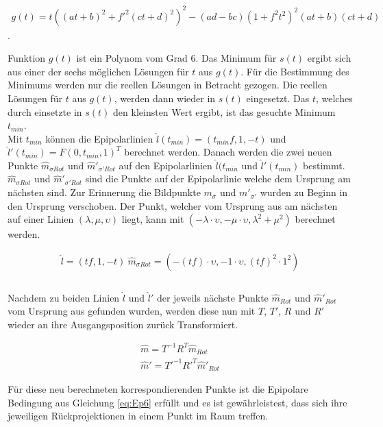 \begin{gather}
	g(t) = t((at+b)^2+f'^2(ct+d)^2)^2-(ad-bc)(1+f^2t^2)^2(at+b)(ct+d)
\end{gather}.

Funktion $g(t)$ ist ein Polynom vom Grad 6. Das Minimum für $s(t)$ ergibt sich aus einer der sechs möglichen Lösungen für $t$ aus $g(t)$. Für die Bestimmung des Minimums werden nur die reellen Lösungen in Betracht gezogen. Die reellen Lösungen für $t$ aus $g(t)$, werden dann wieder in $s(t)$ eingesetzt. Das $t$, welches durch einsetzte in $s(t)$ den kleinsten Wert ergibt, ist das gesuchte Minimum $t_{min}$. \\

Mit $t_{min}$ können die Epipolarlinien $\hat{l}(t_{min})=(t_{min}f,1,-t)$ und $\hat{l}'(t_{min}) = F(0,t_{min},1)^T$ berechnet werden. Danach werden die zwei neuen Punkte $\hat{m}_{\sigma Rot}$ und $\hat{m}'_{\sigma' Rot}$ auf den Epipolarlinien $\hat{l}(t_{min}$ und $\hat{l}'(t_{min})$ bestimmt. $\hat{m}_{\sigma Rot}$ und $\hat{m}'_{\sigma' Rot}$ sind die Punkte auf der Epipolarlinie welche dem Ursprung am nächsten sind. Zur Erinnerung die Bildpunkte $m_\sigma$ und $m'_{\sigma'}$ wurden zu Beginn in den Ursprung verschoben. Der Punkt, welcher vom Ursprung aus am nächsten auf einer Linien $(\lambda, \mu,\upsilon)$ liegt, kann mit $(-\lambda \cdot \upsilon, -\mu \cdot \upsilon, \lambda^2+ \mu^2)$ berechnet werden\cite{HZ}.

\begin{gather}
	\hat{l} = (tf, 1, -t)\
	\hat{m}_{\sigma Rot} = (-(tf) \cdot \upsilon , - 1 \cdot \upsilon, (tf)^2 \cdot 1^2 )\\
\end{gather}\\
 
Nachdem zu beiden Linien $\hat{l}$ und $\hat{l}'$ der jeweils nächste Punkte $\hat{m}_{Rot}$ und $\hat{m}'_{Rot}$ vom Ursprung aus gefunden wurden, werden diese nun mit $T$, $T'$, $R$ und $R'$ wieder an ihre Ausgangsposition zurück Transformiert. 

\begin{gather}
	\hat{m} = T^{-1}R^T\hat{m}_{Rot}\\
	\hat{m}' = T'^{-1}R'^T\hat{m}'_{Rot}
\end{gather}



Für diese neu berechneten korrespondierenden Punkte ist die Epipolare Bedingung aus Gleichung \ref{eq:Ep6} erfüllt und es ist gewährleistest, dass sich ihre jeweiligen Rückprojektionen in einem Punkt im Raum treffen.\\

